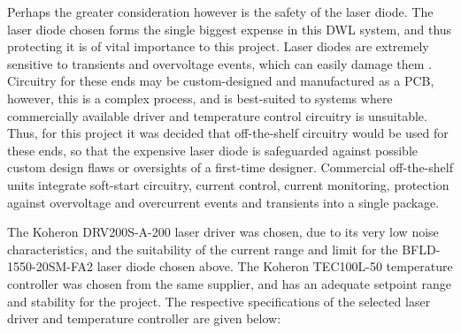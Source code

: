  Perhaps the greater consideration however is the safety of the laser diode. The laser diode chosen forms the single biggest expense in this DWL system, and thus protecting it is of vital importance to this project. Laser diodes are extremely sensitive to transients and overvoltage events, which can easily damage them \cite{gwinner2024}. Circuitry for these ends may be custom-designed and manufactured as a PCB, however, this is a complex process, and is best-suited to systems where commercially available driver and temperature control circuitry is unsuitable. Thus, for this project it was decided that off-the-shelf circuitry would be used for these ends, so that the expensive laser diode is safeguarded against possible custom design flaws or oversights of a first-time designer. Commercial off-the-shelf units integrate soft-start circuitry, current control, current monitoring, protection against overvoltage and overcurrent events and transients into a single package.
 
 The Koheron DRV200S-A-200 laser driver was chosen, due to its very low noise characteristics, and the suitability of the current range and limit for the BFLD-1550-20SM-FA2 laser diode chosen above. The Koheron TEC100L-50 temperature controller was chosen from the same supplier, and has an adequate setpoint range and stability for the project. The respective specifications of the selected laser driver and  temperature controller are given below:
 
